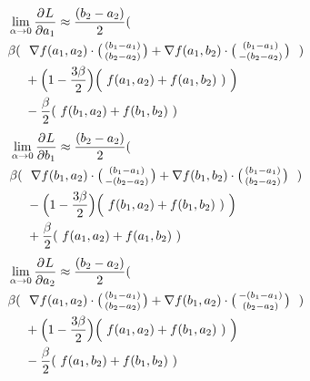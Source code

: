 \begin{equation}
\begin{aligned} 
& \lim_{\alpha \to 0} \frac{\partial^{} L}{\partial a_{1}} \approx \frac{(b_{2}-a_{2})}{2}( \\
&\beta(~~\nabla f(a_1,a_2)\cdot \bigl( \begin{smallmatrix} (b_1 -a_1)\\ (b_2 -a_2) \end{smallmatrix} \bigr) + \nabla f(a_1,b_2)\cdot \bigl( \begin{smallmatrix} (b_1 -a_1)\\ -(b_2 -a_2) \end{smallmatrix} \bigr)~~)\\ &~~~~+\Big(1-\frac{3\beta}{2}\Big)               \Big(~f(a_{1},a_{2}) + f(a_{1},b_{2})~)~\Big) \\ &~~~~- \frac \beta2 (~f(b_{1},a_{2}) + f(b_{1},b_{2})~)
\label{eq:update-outer-2-1-w}
\end{aligned}
\end{equation}
\begin{equation}
\begin{aligned} 
& \lim_{\alpha \to 0} \frac{\partial^{} L}{\partial b_{1}} \approx \frac{(b_{2}-a_{2})}{2}( \\
&\beta(~~\nabla f(b_1,a_2)\cdot \bigl( \begin{smallmatrix} (b_1 -a_1)\\ -(b_2 -a_2) \end{smallmatrix} \bigr) + \nabla f(b_1,b_2)\cdot \bigl( \begin{smallmatrix} (b_1 -a_1)\\ (b_2 -a_2) \end{smallmatrix} \bigr)~~)\\ &~~~~-\Big(1-\frac{3\beta}{2}\Big) \Big(~f(b_{1},a_{2}) + f(b_{1},b_{2})~)~\Big) \\ &~~~~+ \frac \beta2 (~f(a_{1},a_{2}) + f(a_{1},b_{2})~)
\label{eq:update-outer-2-2-w}
\end{aligned}
\end{equation}
\begin{equation}
\begin{aligned} 
& \lim_{\alpha \to 0} \frac{\partial^{} L}{\partial a_{2}} \approx \frac{(b_{2}-a_{2})}{2}( \\
&\beta(~~\nabla f(a_1,a_2)\cdot \bigl( \begin{smallmatrix} (b_1 -a_1)\\ (b_2 -a_2) \end{smallmatrix} \bigr) + \nabla f(b_1,a_2)\cdot \bigl( \begin{smallmatrix} -(b_1 -a_1)\\ (b_2 -a_2) \end{smallmatrix} \bigr)~~)\\ &~~~~+\Big(1-\frac{3\beta}{2}\Big)               \Big(~f(a_{1},a_{2}) + f(b_{1},a_{2})~)~\Big) \\ &~~~~- \frac \beta2 (~f(a_{1},b_{2}) + f(b_{1},b_{2})~)
\label{eq:update-outer-2-3-w}
\end{aligned}
\end{equation}
